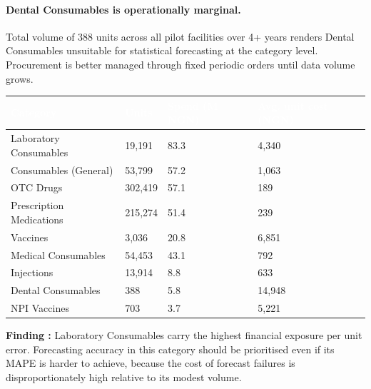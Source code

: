 \documentclass[12pt, a4paper]{article}
\newcounter{finding}
\newcommand{\finding}[1]{%
  \stepcounter{finding}%
  \begin{mdframed}[style=greenbox]
  \textbf{Finding \thefinding:} #1
  \end{mdframed}%
}
\begin{document}
\paragraph{Dental Consumables is operationally marginal.}
Total volume of 388 units across all pilot facilities over 4+ years
renders Dental Consumables unsuitable for statistical forecasting at
the category level. Procurement is better managed through
fixed periodic orders until data volume grows.

\vspace{0.5em}
\noindent
\begin{tabularx}{\textwidth}{@{} L{4.5cm} R{2cm} R{2.5cm} R{2.8cm} @{}}
  \toprule
  \textcolor{white}{\textbf{Category}} &
  \textcolor{white}{\textbf{Units}} &
  \textcolor{white}{\textbf{Spend (M NGN)}} &
  \textcolor{white}{\textbf{Avg. unit cost (NGN)}} \\
  \midrule
  Laboratory Consumables   & 19,191  & 83.3  & 4,340 \\
  Consumables (General)    & 53,799  & 57.2  & 1,063 \\
  OTC Drugs                & 302,419 & 57.1  & 189 \\
  Prescription Medications & 215,274 & 51.4  & 239 \\
  Vaccines                 & 3,036   & 20.8  & 6,851 \\
  Medical Consumables      & 54,453  & 43.1  & 792 \\
  Injections               & 13,914  & 8.8   & 633 \\
  Dental Consumables       & 388     & 5.8   & 14,948 \\
  NPI Vaccines             & 703     & 3.7   & 5,221 \\
  \bottomrule
\end{tabularx}
\vspace{0.3em}

\finding{Laboratory Consumables carry the highest financial exposure per
unit error. Forecasting accuracy in this category should be prioritised
even if its MAPE is harder to achieve, because the cost of forecast
failures is disproportionately high relative to its modest volume.}

\end{document}
